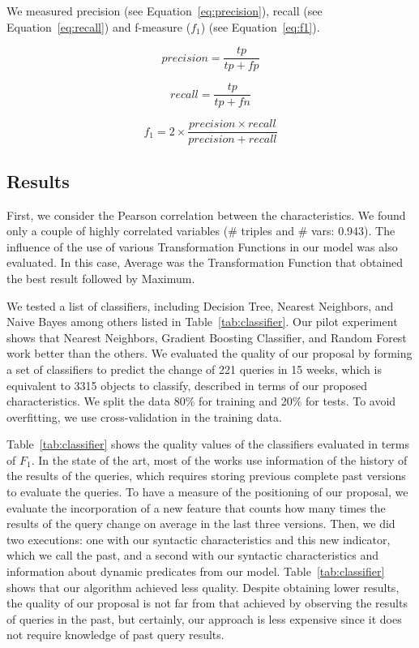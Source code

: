 \documentclass[runningheads]{llncs}
\begin{document}
We measured precision (see Equation~\ref{eq:precision}), recall (see Equation~\ref{eq:recall}) and f-measure ($f_1$) (see Equation~\ref{eq:f1}).

\begin{equation}
\label{eq:precision}
precision = \frac{tp}{tp + fp}
\end{equation}

\begin{equation}
\label{eq:recall}
recall = \frac{tp}{tp + fn}
\end{equation}

\begin{equation}
\label{eq:f1}
f_1 = 2 \times \frac{precision \times recall}{precision + recall}
\end{equation}

\subsection{Results}

First, we consider the Pearson correlation between the characteristics. We found only a couple of highly correlated variables (\# triples and \# vars: 0.943). The influence of the use of various Transformation Functions in our model was also evaluated. In this case, Average was the Transformation Function that obtained the best result followed by Maximum.

We tested a list of classifiers, including Decision Tree, Nearest Neighbors, and Naive Bayes among others listed in Table~\ref{tab:classifier}. Our pilot experiment shows that Nearest Neighbors, Gradient Boosting Classifier, and Random Forest work better than the others. We evaluated the quality of our proposal by forming a set of classifiers to predict the change of 221 queries in 15 weeks, which is equivalent to 3315 objects to classify, described in terms of our proposed characteristics. We split the data 80\% for training and 20\% for tests. To avoid overfitting, we use cross-validation in the training data.

Table~\ref{tab:classifier} shows the quality values of the classifiers evaluated in terms of $F_1$. In the state of the art, most of the works use information of the history of the results of the queries, which requires storing previous complete past versions to evaluate the queries. To have a measure of the positioning of our proposal, we evaluate the incorporation of a new feature that counts how many times the results of the query change on average in the last three versions. Then, we did two executions: one with our syntactic characteristics and this new indicator, which we call the past, and a second with our syntactic characteristics and information about dynamic predicates from our model. Table~\ref{tab:classifier} shows that our algorithm achieved less quality. Despite obtaining lower results, the quality of our proposal is not far from that achieved by observing the results of queries in the past, but certainly, our approach is less expensive since it does not require knowledge of past query results.
\end{document}
